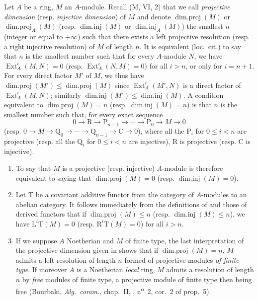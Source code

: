 \begin{env}[17.2.1]
\label{0.17.2.1}
Let $A$ be a ring, $M$ an $A$-module.
Recall (M, VI, 2) that we call \emph{projective dimension} (resp. \emph{injective dimension}) of $M$ and denote $\operatorname{dim.proj}(M)$ or $\operatorname{dim.proj}_A(M)$ (resp. $\operatorname{dim.inj}(M)$ or $\operatorname{dim.inj}_A(M)$) the smallest $n$ (integer or equal to $+\infty$) such that there exists a left projective resolution (resp. a right injective resolution) of $M$ of length $n$.
It is equivalent (loc.\ cit.) to say that $n$ is the smallest number such that for every $A$-module $N$, we have $\operatorname{Ext}^i_A(M,N)=0$ (resp. $\operatorname{Ext}^i_A(N,M)=0$) for all $i>n$, or only for $i=n+1$.
For every direct factor $M'$ of $M$, we thus have $\operatorname{dim.proj}(M')\leq\operatorname{dim.proj}(M)$ since $\operatorname{Ext}^i_A(M',N)$ is a direct factor of $\operatorname{Ext}^i_A(M,N)$;
similarly $\operatorname{dim.inj}(M')\leq\operatorname{dim.inj}(M)$.
A condition equivalent to $\operatorname{dim.proj}(M)=n$ (resp. $\operatorname{dim.inj}(M)=n$) is that $n$ is the smallest number such that, for every exact sequence
\[
  0\to\mathrm{R}\to\mathrm{P}_{n-1}\to\cdots\to\mathrm{P}_0\to M\to 0
\]
(resp. $0\to M\to\mathrm{Q}_0\to\cdots\to\mathrm{Q}_{n-1}\to\mathrm{C}\to 0$), where all the $\mathrm{P}_i$ for $0\leq i<n$ are projective (resp. all the $\mathrm{Q}_i$ for $0\leq i<n$ are injective), $\mathrm{R}$ is projective (resp. $\mathrm{C}$ is injective).
\end{env}

\begin{remark}[17.2.2]
\label{0.17.2.2}
\begin{enumerate}
  \item[{\rm(i)}] To say that $M$ is a projective (resp. injective) $A$-module is therefore equivalent to saying that $\operatorname{dim.proj}(M)=0$ (resp. $\operatorname{dim.inj}(M)=0$).
  \item[{\rm(ii)}] Let $\mathrm{T}$ be a covariant additive functor from the category of $A$-modules to an abelian category.
  It follows immediately from the definitions of  and those of derived functors that if $\operatorname{dim.proj}(M)\leq n$ (resp. $\operatorname{dim.inj}(M)\leq n$), we have $\mathrm{L}^i\mathrm{T}(M)=0$ (resp. $\mathrm{R}^i\mathrm{T}(M)=0$) for all $i>n$.
  \item[{\rm(iii)}] If we suppose $A$ Noetherian and $M$ of finite type, the last interpretation of the projective dimension given in  shows that if $\operatorname{dim.proj}(M)=n$, $M$ admits a left resolution of length $n$ formed of projective modules \emph{of finite type}.
  If moreover $A$ is a Noetherian \emph{local} ring, $M$ admits a resolution of length $n$ by \emph{free} modules of finite type, a projective module of finite type then being free (Bourbaki, \emph{Alg.~comm.}, chap.~II, , n\textsuperscript{o}~2, cor.~2 of prop.~5).
\end{enumerate}
\end{remark}


